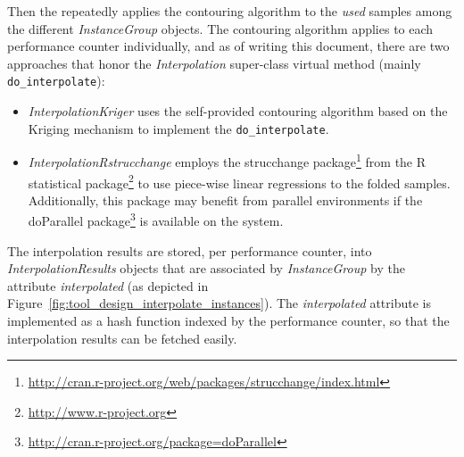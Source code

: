 

Then the \FOLDING repeatedly applies the contouring algorithm to the \textit{used} samples among the different \textsl{InstanceGroup} objects.
The contouring algorithm applies to each performance counter individually, and as of writing this document, there are two approaches that honor the \textsl{Interpolation} super-class virtual method (mainly \texttt{do\_interpolate}):

\begin{itemize}

	\item \textsl{InterpolationKriger} uses the self-provided contouring algorithm based on the Kriging mechanism to implement the \texttt{do\_interpolate}.

	\item \textsl{InterpolationRstrucchange} employs the strucchange package\footnote{\url{http://cran.r-project.org/web/packages/strucchange/index.html}} from the R statistical package\footnote{\url{http://www.r-project.org}} to use piece-wise linear regressions to the folded samples. Additionally, this package may benefit from parallel environments if the doParallel package\footnote{\url{http://cran.r-project.org/package=doParallel}} is available on the system.

\end{itemize}

The interpolation results are stored, per performance counter, into \textsl{InterpolationResults} objects that are associated by \textsl{InstanceGroup} by the attribute \textit{interpolated} (as depicted in Figure~\ref{fig:tool_design_interpolate_instances}).
The \textit{interpolated} attribute is implemented as a hash function indexed by the performance counter, so that the interpolation results can be fetched easily.





